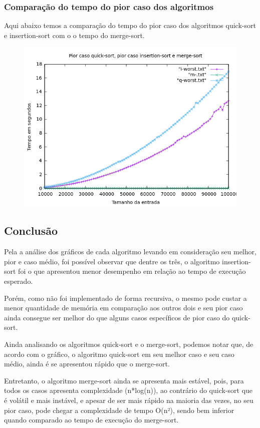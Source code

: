 \newpage
\subsubsection{Comparação do tempo do pior caso dos algoritmos}
Aqui abaixo temos a comparação do tempo do pior caso dos algoritmos quick-sort e insertion-sort com o o tempo do merge-sort.
\begin{figure}[h]
    \centering
    \includegraphics[width=1\linewidth]{Imagens/imq-worst.png}
\end{figure}

\newpage
\subsection{Conclusão}
Pela a análise dos gráficos de cada algoritmo levando em consideração seu melhor, pior e caso médio, foi possível observar que dentre os três, o algoritmo insertion-sort foi o que apresentou menor desempenho em relação ao tempo de execução esperado.

Porém, como não foi implementado de forma recursiva, o mesmo pode custar a menor quantidade de memória em comparação aos outros dois e seu pior caso ainda consegue ser melhor do que alguns casos específicos de pior caso do quick-sort.

Ainda analisando os algoritmos quick-sort e o merge-sort, podemos notar que, de acordo com o gráfico, o algoritmo quick-sort em seu melhor caso e seu caso médio, ainda é se apresentou rápido que o merge-sort.

Entretanto, o algoritmo merge-sort ainda se apresenta mais estável, pois, para todos os casos apresenta complexidade (n*log(n)), ao contrário do quick-sort que é volátil e mais instável, e apesar de ser mais rápido na maioria das vezes, no seu pior caso, pode chegar a complexidade de tempo O(n²), sendo bem inferior quando comparado ao tempo de execução do merge-sort.

